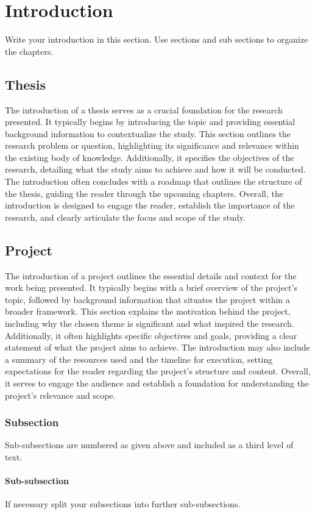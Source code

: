 \chapter{Introduction}\label{intro}
Write your introduction in this section.
Use sections and sub sections to organize the chapters.

\section{Thesis}
The introduction of a thesis serves as a crucial foundation for the research presented. It typically begins by introducing the topic and providing essential background information to contextualize the study. This section outlines the research problem or question, highlighting its significance and relevance within the existing body of knowledge. Additionally, it specifies the objectives of the research, detailing what the study aims to achieve and how it will be conducted. The introduction often concludes with a roadmap that outlines the structure of the thesis, guiding the reader through the upcoming chapters. Overall, the introduction is designed to engage the reader, establish the importance of the research, and clearly articulate the focus and scope of the study.
\section{Project}
The introduction of a project outlines the essential details and context for the work being presented. It typically begins with a brief overview of the project’s topic, followed by background information that situates the project within a broader framework. This section explains the motivation behind the project, including why the chosen theme is significant and what inspired the research. Additionally, it often highlights specific objectives and goals, providing a clear statement of what the project aims to achieve. The introduction may also include a summary of the resources used and the timeline for execution, setting expectations for the reader regarding the project's structure and content. Overall, it serves to engage the audience and establish a foundation for understanding the project's relevance and scope.
\subsection{Subsection}
Sub-subsections are numbered as given above and included as a third level of text. 
\subsubsection{Sub-subsection}
If necessary split your subsections into further sub-subsections.

